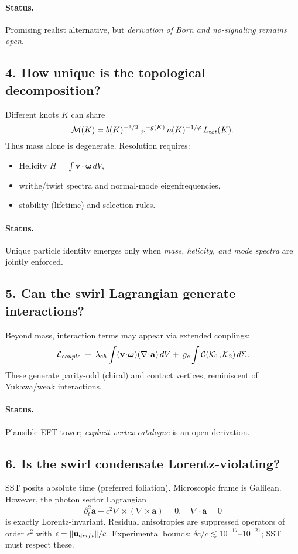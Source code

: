 \documentclass[11pt]{article}
\begin{document}
\paragraph{Status.} Promising realist alternative, but \emph{derivation of Born and no-signaling remains open}.

\subsection*{4. How unique is the topological decomposition?}
Different knots $K$ can share
\[
    \mathcal M(K)=b(K)^{-3/2}\,\varphi^{-g(K)}\,n(K)^{-1/\varphi}\,L_{\textrm tot}(K).
\]
Thus mass alone is degenerate. Resolution requires:
\begin{itemize}
\item Helicity $H=\int \mathbf v\!\cdot\!\boldsymbol\omega\,dV$,
\item writhe/twist spectra and normal-mode eigenfrequencies,
\item stability (lifetime) and selection rules.
\end{itemize}

\paragraph{Status.} Unique particle identity emerges only when \emph{mass, helicity, and mode spectra} are jointly enforced.

\subsection*{5. Can the swirl Lagrangian generate interactions?}
Beyond mass, interaction terms may appear via extended couplings:
\[
    \mathcal L_{\textrm couple}\;+\;\lambda_{\textrm ch}\int (\mathbf v\!\cdot\!\boldsymbol\omega)(\nabla\!\cdot\!\mathbf a)\,dV
    +\;g_c \int \mathcal C(\mathcal K_1,\mathcal K_2)\,d\Sigma.
\]
These generate parity-odd (chiral) and contact vertices, reminiscent of Yukawa/weak interactions.

\paragraph{Status.} Plausible EFT tower; \emph{explicit vertex catalogue} is an open derivation.

\subsection*{6. Is the swirl condensate Lorentz-violating?}
SST posits absolute time (preferred foliation). Microscopic frame is Galilean.
However, the photon sector Lagrangian
\[
    \partial_t^2 \mathbf a - c^2 \nabla\times(\nabla\times \mathbf a)=0,\quad \nabla\cdot\mathbf a=0
\]
is exactly Lorentz-invariant. Residual anisotropies are suppressed operators of order $\epsilon^2$ with $\epsilon=\|\mathbf u_{\textrm drift}\|/c$.
Experimental bounds: $\delta c/c \lesssim 10^{-17}$--$10^{-21}$; SST must respect these.
\end{document}
